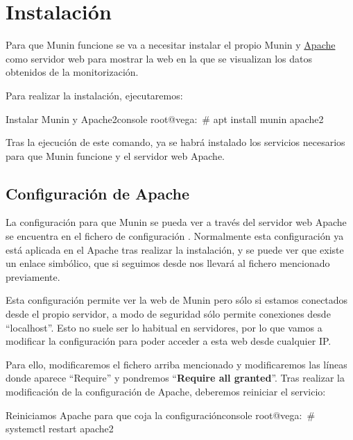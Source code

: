 \section{Instalación}
Para que Munin funcione se va a necesitar instalar el propio Munin y \href{https://httpd.apache.org/}{Apache} como servidor web para mostrar la web en la que se visualizan los datos obtenidos de la monitorización.

Para realizar la instalación, ejecutaremos:

\begin{mycode}{Instalar Munin y Apache2}{console}{}
root@vega:~# apt install munin apache2
\end{mycode}

Tras la ejecución de este comando, ya se habrá instalado los servicios necesarios para que Munin funcione y el servidor web Apache.

\subsection{Configuración de Apache}
La configuración para que Munin se pueda ver a través del servidor web Apache se encuentra en el fichero de configuración   . Normalmente esta configuración ya está aplicada en el Apache tras realizar la instalación, y se puede ver que existe un enlace simbólico, que si seguimos desde    nos llevará al fichero mencionado previamente.

Esta configuración permite ver la web de Munin pero sólo si estamos conectados desde el propio servidor, a modo de seguridad sólo permite conexiones desde “localhost”. Esto no suele ser lo habitual en servidores, por lo que vamos a modificar la configuración para poder acceder a esta web desde cualquier IP.



Para ello, modificaremos el fichero arriba mencionado y modificaremos las líneas donde aparece “Require” y pondremos “\textbf{Require all granted}”. Tras realizar la modificación de la configuración de Apache, deberemos reiniciar el servicio:

\begin{mycode}{Reiniciamos Apache para que coja la configuración}{console}{}
root@vega:~# systemctl restart apache2
\end{mycode}

